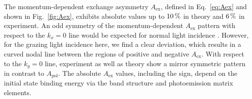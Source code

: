 \documentclass[prl,twocolumn,floatfix]{revtex4-2}
\begin{document}
The momentum-dependent exchange asymmetry $A_{\mathrm{ex}}$, defined in Eq.~\eqref{eq:Aex} and shown in Fig.~\ref{fig:Aex}, exhibits absolute values up to $\unit[10]{\%}$ in theory and $\unit[6]{\%}$ in experiment. An odd symmetry of the momentum-dependent $A_{\mathrm{ex}}$ pattern with respect to the $k_{x} = 0$ line would be expected for normal light incidence \cite{schumann2024}. However, for the grazing light incidence here, we find a clear deviation, which results in a curved nodal line between the regions of positive and negative $A_{\mathrm{ex}}$. With respect to the $k_{y} = 0$ line, experiment as well as theory show a mirror symmetric pattern in contrast to $A_{\mathrm{pol}}$. The absolute $A_{\mathrm{ex}}$ values, including the sign, depend on the initial state binding energy via the band structure and photoemission matrix elements.
\end{document}
